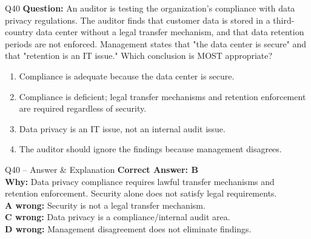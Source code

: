 \documentclass[aspectratio=169,10pt]{beamer}
\begin{document}
	\begin{frame}[t]{Q40}
		\small
		\textbf{Question:} An auditor is testing the organization's compliance with data privacy regulations. The auditor finds that customer data is stored in a third-country data center without a legal transfer mechanism, and that data retention periods are not enforced. Management states that "the data center is secure" and that "retention is an IT issue." Which conclusion is MOST appropriate?
		\begin{enumerate}[label=\Alph*.,itemsep=1pt,topsep=2pt]
			\item Compliance is adequate because the data center is secure.
			\item Compliance is deficient; legal transfer mechanisms and retention enforcement are required regardless of security.
			\item Data privacy is an IT issue, not an internal audit issue.
			\item The auditor should ignore the findings because management disagrees.
		\end{enumerate}
	\end{frame}
	
	\begin{frame}[t]{Q40 -- Answer \& Explanation}
		\small
		\textbf{Correct Answer: B} \\[4pt]
		\textbf{Why:} Data privacy compliance requires lawful transfer mechanisms and retention enforcement. Security alone does not satisfy legal requirements. \\[4pt]
		\textbf{A wrong:} Security is not a legal transfer mechanism. \\[2pt]
		\textbf{C wrong:} Data privacy is a compliance/internal audit area. \\[2pt]
		\textbf{D wrong:} Management disagreement does not eliminate findings.
	\end{frame}
	
\end{document}

